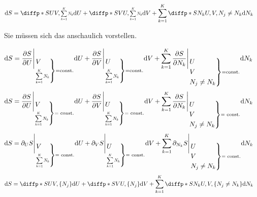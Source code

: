 \documentclass[a4paper]{article}
\begin{document}
\begin{align*}
	\tdiff{S} &= \pdiff*{S}{U}{V,\scalebox{.7}{$\displaystyle{\sum_{k=1}^{K}N_k}$}} \tdiff{U} + \pdiff*{S}{V}{U,\scalebox{.7}{$\displaystyle{\sum_{k=1}^{K}N_k}$}} \tdiff{V} + \sum_{k=1}^{K}\pdiff*{S}{{N_k}}{U,V,N_j\neq N_k}\tdiff{N_k}
\end{align*}
\begin{center}
	\sc Sie müssen sich das anschaulich vorstellen.
\end{center}
\begin{align*}
	\m{d}S
	&= \frac{\del S}{\del U}\Bigg{|}_{
	\begin{rcases}
		V\\
		\scalebox{.7}{$\displaystyle{\sum_{k=1}^{K}N_k}$}
	\end{rcases}
	= \m{const.}
	}
	\m{d}U
	+ \frac{\del S}{\del V}\Bigg{|}_{
	\begin{rcases}
		U\\
		\scalebox{.7}{$\displaystyle{\sum_{k=1}^{K}N_k}$}
	\end{rcases}
	= \m{const.}
	}
	\m{d}V
	+ \sum_{k=1}^{K}\frac{\del S}{\del N_k}\Bigg{|}_{
	\begin{rcases}
		U\\
		V\\
		N_j\neq N_k
	\end{rcases}
	= \m{const.}
	}
	\m{d}N_k
\end{align*}
\begin{align*}
	\m{d}S
	&= \frac{\del S}{\del U}\Bigg{|}_{\twocases{V}{\scalebox{.7}{$\displaystyle{\sum_{k=1}^{K}N_k}$}}{=\m{ const.}}}\m{d}U
	+ \frac{\del S}{\del V}\Bigg{|}_{\twocases{U}{\scalebox{.7}{$\displaystyle{\sum_{k=1}^{K}N_k}$}}{=\m{ const.}}}\m{d}V
	+ \sum_{k=1}^{K}\frac{\del S}{\del N_k}\Bigg{|}_{\threecases{U}{V}{N_j\neq N_k}{=\m{ const.}}}\m{d}N_k
\end{align*}
\begin{align*}
	\m{d}S
	&= \del_{U}S\Bigg{|}_{\twocases{V}{\scalebox{.7}{$\displaystyle{\sum_{k=1}^{K}N_k}$}}{=\m{ const.}}}\m{d}U
	+ \del_{V}S\Bigg{|}_{\twocases{U}{\scalebox{.7}{$\displaystyle{\sum_{k=1}^{K}N_k}$}}{=\m{ const.}}}\m{d}V
	+ \sum_{k=1}^{K}\del_{N_k}S\Bigg{|}_{\threecases{U}{V}{N_j\neq N_k}{=\m{ const.}}}\m{d}N_k
\end{align*}
\begin{align*}
	\tdiff{S} &
	= \pdiff*{S}{U}{V,\{N_j\}} \tdiff{U} 
	+ \pdiff*{S}{V}{U,\{N_j\}} \tdiff{V} 
	+ \sum_{k=1}^{K}\pdiff*{S}{{N_k}}{U,V,\{N_j\neq N_k\}}\tdiff{N_k}
\end{align*}
\end{document}
